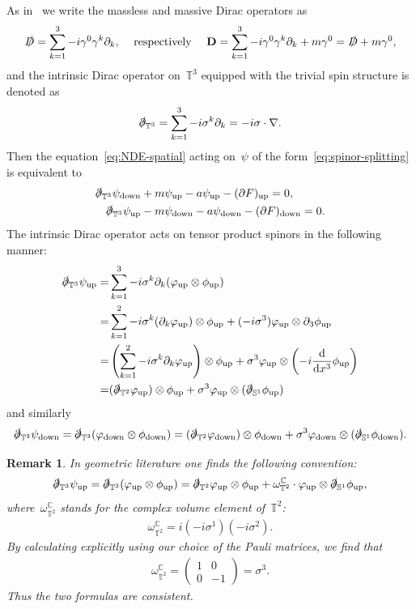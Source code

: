 \documentclass[11pt,final]{amsart}
\newcommand{\p}{\partial}
\newcommand{\C}{\mathbb{C}}
\newcommand{\T}{\mathbb{T}}
\newcommand{\D}{\slashed{D}}
\newcommand{\pd}{\slashed{\partial}}
\newcommand{\dd}{\mathop{}\!\mathrm{d}}
\newcommand{\sph}{\mathbb{S}}
\newcommand{\pD}{\mathbf{D}}
\newcommand{\parenthesis}[1]{\left(#1\right)} %
\DeclareMathOperator{\up}{up}
\DeclareMathOperator{\down}{down}
\newtheorem{rmk}[thm]{Remark}
\begin{document}
As in~\cite{WZ2026Stationary} we write the massless and massive Dirac operators as 
\begin{align}
    \D=\sum_{k=1}^3 -i\gamma^0\gamma^k \p_k, & & \mbox{ respectively } & & 
    \pD=\sum_{k=1}^3 -i\gamma^0\gamma^k\p_k+m\gamma^0 =\D+m\gamma^0, 
\end{align}
and the intrinsic Dirac operator on~$\mathbb{T}^3$ equipped with the trivial spin structure is denoted as 
\begin{align}
    \pd_{\T^3}=\sum_{k=1}^3 -i\sigma^k \p_k = -i\sigma\cdot \nabla. 
\end{align}
Then the equation~\eqref{eq:NDE-spatial} acting on~$\psi$ of the form~\eqref{eq:spinor-splitting} is equivalent to 
\begin{align}
    \pd_{\T^3}\psi_{\down} & + m\psi_{\up} - a \psi_{\up} - (\p F)_{\up}=0,  \\
    \pd_{\T^3}\psi_{\up} & -m\psi_{\down} - a \psi_{\down} - (\p F)_{\down }=0. 
\end{align}
The intrinsic Dirac operator acts on tensor product spinors in the following manner: 
\begin{align}
    \pd_{\T^3} \psi_{\up} 
    =& \sum_{k=1}^3  -i\sigma^k\p_k (\varphi_{\up}\otimes \phi_{\up}) \\
    =& \sum_{k=1}^2 -i\sigma^k(\p_k\varphi_{\up})\otimes \phi_{\up}  + (-i\sigma^3)\varphi_{\up}\otimes \p_3\phi_{\up} \\
    =& \parenthesis{\sum_{k=1}^2 -i\sigma^k\p_k\varphi_{\up} }\otimes \phi_{\up}
       + \sigma^3\varphi_{\up}\otimes \parenthesis{-i\frac{\dd}{\dd x^3}\phi_{\up}} \\
    =& (\pd_{\T^2}\varphi_{\up})\otimes\phi_{\up}
        +\sigma^3\varphi_{\up}\otimes (\pd_{\sph^1}\phi_{\up})
\end{align}
and similarly 
\begin{align}
    \pd_{\T^3}\psi_{\down}
    = \pd_{\T^3} (\varphi_{\down}\otimes \phi_{\down}) 
    = (\pd_{\T^2} \varphi_{\down})\otimes \phi_{\down}
     + \sigma^3\varphi_{\down}\otimes (\pd_{\sph^1}\phi_{\down}). 
\end{align}
\begin{rmk}
    In geometric literature one finds the following convention:
    \begin{align}
        \pd_{\T^3} \psi_{\up} 
    = \pd_{\T^3} (\varphi_{\up}\otimes \phi_{\up}) 
    = \pd_{\T^2} \varphi_{\up}\otimes \phi_{\up}
     + \omega_{\T^2}^{\C}\cdot\varphi_{\up}\otimes \pd_{\sph^1}\phi_{\up},
    \end{align}
    where~$\omega_{\T^2}^{\C}$ stands for the complex volume element of~$\T^2$:
    \begin{align}
    \omega_{\T^2}^{\C}=i(-i\sigma^1)(-i\sigma^2).
    \end{align}
    By calculating explicitly using our choice of the Pauli matrices, we find that 
    \begin{align}
        \omega_{\T^2}^{\C}= \begin{pmatrix} 1 & 0 \\ 0 & -1 \end{pmatrix} = \sigma^3.
    \end{align}
    Thus the two formulas are consistent. 
\end{rmk}
\end{document}
